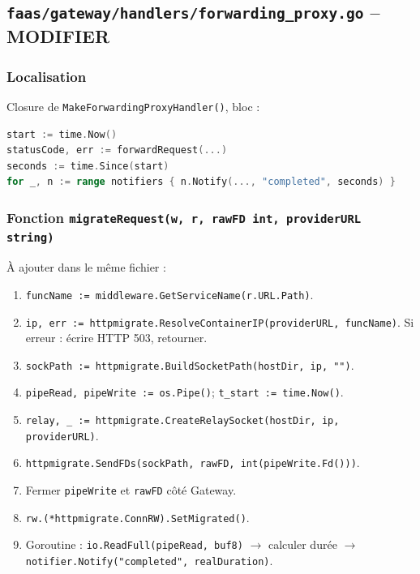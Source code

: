 \documentclass[11pt,a4paper]{article}
\begin{document}

\subsection{\texttt{faas/gateway/handlers/forwarding\_proxy.go} -- MODIFIER}

\subsubsection{Localisation}
Closure de \texttt{MakeForwardingProxyHandler()}, bloc :

\begin{lstlisting}[language=Go]
start := time.Now()
statusCode, err := forwardRequest(...)
seconds := time.Since(start)
for _, n := range notifiers { n.Notify(..., "completed", seconds) }
\end{lstlisting}

\subsubsection{Fonction \texttt{migrateRequest(w, r, rawFD int, providerURL string)}}
À ajouter dans le même fichier :
\begin{enumerate}
  \item \texttt{funcName := middleware.GetServiceName(r.URL.Path)}.
  \item \texttt{ip, err := httpmigrate.ResolveContainerIP(providerURL, funcName)}.
    Si erreur : écrire HTTP 503, retourner.
  \item \texttt{sockPath := httpmigrate.BuildSocketPath(hostDir, ip, "")}.
  \item \texttt{pipeRead, pipeWrite := os.Pipe()}; \texttt{t\_start := time.Now()}.
  \item \texttt{relay, \_ := httpmigrate.CreateRelaySocket(hostDir, ip, providerURL)}.
  \item \texttt{httpmigrate.SendFDs(sockPath, rawFD, int(pipeWrite.Fd()))}.
  \item Fermer \texttt{pipeWrite} et \texttt{rawFD} côté Gateway.
  \item \texttt{rw.(*httpmigrate.ConnRW).SetMigrated()}.
  \item Goroutine : \texttt{io.ReadFull(pipeRead, buf8)} $\to$ calculer durée $\to$
    \texttt{notifier.Notify("completed", realDuration)}.
\end{enumerate}
\end{document}
